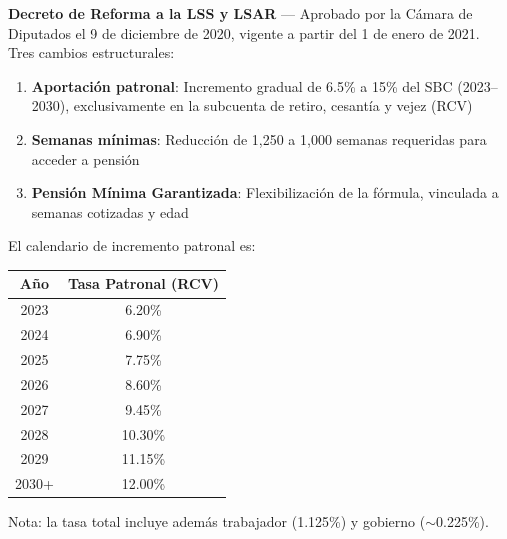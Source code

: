 \documentclass[11pt,a4paper]{report}
\begin{document}
\begin{tcolorbox}[colback=blue!5!white, colframe=blue!75!black, title=\textbf{Definici\'on Formal}]
\textbf{Decreto de Reforma a la LSS y LSAR} --- Aprobado por la C\'amara de Diputados el 9 de diciembre de 2020, vigente a partir del 1 de enero de 2021.\\[0.3em]
Tres cambios estructurales:
\begin{enumerate}[nosep]
\item \textbf{Aportaci\'on patronal}: Incremento gradual de 6.5\% a 15\% del SBC (2023--2030), exclusivamente en la subcuenta de retiro, cesant\'ia y vejez (RCV)
\item \textbf{Semanas m\'inimas}: Reducci\'on de 1,250 a 1,000 semanas requeridas para acceder a pensi\'on
\item \textbf{Pensi\'on M\'inima Garantizada}: Flexibilizaci\'on de la f\'ormula, vinculada a semanas cotizadas y edad
\end{enumerate}
El calendario de incremento patronal es:
\begin{center}
\begin{tabular}{cc}
\toprule
\textbf{A\~no} & \textbf{Tasa Patronal (RCV)} \\
\midrule
2023 & 6.20\% \\
2024 & 6.90\% \\
2025 & 7.75\% \\
2026 & 8.60\% \\
2027 & 9.45\% \\
2028 & 10.30\% \\
2029 & 11.15\% \\
2030+ & 12.00\% \\
\bottomrule
\end{tabular}
\end{center}
Nota: la tasa total incluye adem\'as trabajador (1.125\%) y gobierno ($\sim$0.225\%).
\end{tcolorbox}
\end{document}
